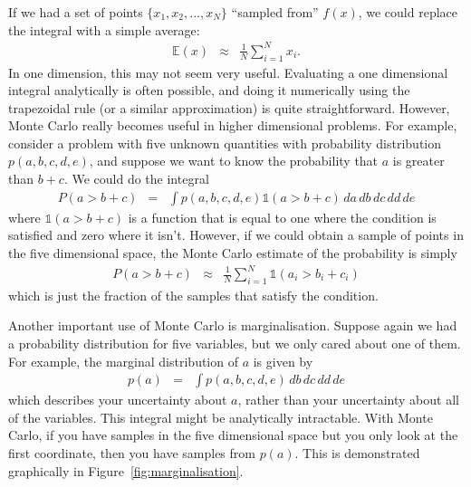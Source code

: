 If we had a set of points $\{x_1, x_2, ..., x_N\}$ ``sampled from'' $f(x)$,
we could replace the integral with a simple average:
\begin{eqnarray}
\mathds{E}(x) &\approx& \frac{1}{N} \sum_{i=1}^N x_i.
\end{eqnarray}
In one dimension, this may not seem very useful. Evaluating a one dimensional
integral analytically is often possible, and doing it numerically using the
trapezoidal rule (or a similar approximation) is quite straightforward.
However, Monte Carlo really becomes useful in higher dimensional problems.
For example, consider a problem with five unknown quantities with probability
distribution $p(a, b, c, d, e)$, and suppose we want to know the probability
that $a$ is greater than $b + c$. We could do the integral
\begin{eqnarray}
P(a > b + c) &=& \int p(a, b, c, d, e) \mathds{1}\left(a > b + c\right) \, da \, db \, dc \,dd \,de 
\end{eqnarray}
where $\mathds{1}\left(a > b + c\right)$ is a function that is equal to one
where the condition is satisfied and zero where it isn't. However, if we could
obtain a sample of points in the five dimensional space, the Monte Carlo
estimate of the probability is simply
\begin{eqnarray}
P(a > b + c) &\approx& \frac{1}{N}\sum_{i=1}^N \mathds{1}\left(a_i > b_i + c_i\right)
\end{eqnarray}
which is just the fraction of the samples that satisfy the condition.

Another important use of Monte Carlo is marginalisation. Suppose again we had
a probability distribution for five variables, but we only cared about one of
them. For example, the marginal distribution of $a$ is given by
\begin{eqnarray}
p(a) &=& \int p(a, b, c, d, e) \, db \, dc \, dd \, de
\end{eqnarray}
which describes your uncertainty about $a$, rather than your uncertainty about
all of the variables. This integral might be analytically intractable. With
Monte Carlo, if you have samples in the five dimensional space but you only
look at the first coordinate, then you have samples from $p(a)$. This is
demonstrated graphically in Figure~\ref{fig:marginalisation}.

